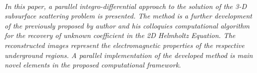 \begin{multicols}{2}
        \\\\
        \\
        \\\\
\\
      \textit{In this paper, a parallel integro-differential approach to
the solution of the 3-D subsurface scattering problem is presented. The method is a
further development of the previously proposed by author and his colloquies
computational algorithm for the recovery of unknown coefficient in the
2D Helmholtz Equation. The reconstructed images represent the electromagnetic properties of the respective underground regions. A parallel implementation of the developed method is main novel elements in the proposed computational
framework.}\\
\\ 
        \\
        \\\\
\\
\end{multicols}

